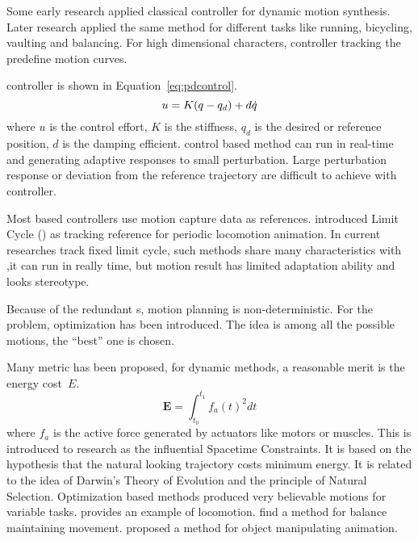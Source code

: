 \begin{itemize}




Some early research applied classical \pd controller \citep{Raibert1991} for dynamic motion synthesis.
Later research \citep{Hodgins1995} applied the same method for different tasks like running, bicycling, vaulting and balancing. 
For high dimensional characters, \pd controller tracking the predefine motion curves\citep{Yin2007}.

\pd controller is shown in Equation~\ref{eq:pdcontrol}.
\begin{equation}
\label{eq:pdcontrol}
u=K(q -q_d)+d\dot{q}
\end{equation}
where $u$ is the control effort, $K$ is the stiffness, $q_d$ is the desired or reference position, $d$ is the damping efficient.
\pd control based method can run in real-time and generating adaptive responses to small perturbation.
Large perturbation response or deviation from the reference trajectory are difficult to achieve with \pd controller.


Most \pd based controllers use motion capture data as references.
\citet{Laszlo1996} introduced Limit Cycle (\lc) as tracking reference for periodic locomotion animation. 
In current researches\citep{Coros2009,coros2010generalized,Laszlo1996} track fixed limit cycle,
such methods share many characteristics with \pd,it can run in really time, but motion result has limited adaptation ability and looks stereotype.







Because of the redundant \dof s, motion planning is non-deterministic.
For the problem, optimization has been introduced.
The idea is among all the possible motions, the ``best'' one is chosen.

Many metric has been proposed, 
for dynamic methods, a reasonable merit is the energy cost~$E$. 
\begin{equation}
 \textbf{E}=\int_{t_0}^{t_1}f_{a}(t)^2dt
\end{equation}
where $f_{a}$ is the active force generated by actuators like motors or muscles. 
This is introduced to \cms research as the influential Spacetime Constraints\citep{Witkin1988}. 
It is based on the hypothesis that the natural looking trajectory costs minimum energy. 
It is related to the idea of Darwin's Theory of Evolution and the principle of Natural Selection. 
Optimization based  methods produced very believable motions for variable tasks. 
\citet{Jain2009} provides an example of locomotion.  
\citet{BalanceControl} find a method for balance maintaining movement. 
\citet{Liu2009} proposed a method for object manipulating animation. 
\end{itemize}


